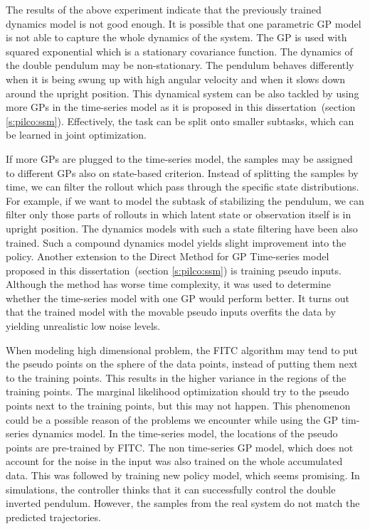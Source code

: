 \noindent The results of the above experiment indicate that the previously trained dynamics model is not good enough. It is possible that one parametric GP model is not able to capture the whole dynamics of the system. The GP is used with squared exponential which is a stationary covariance function. The dynamics of the double pendulum may be non-stationary. The pendulum behaves differently when it is being swung up with high angular velocity and when it slows down around the upright position. This dynamical system can be also tackled by using more GPs in the time-series model as it is proposed in this dissertation\ (section \ref{s:pilco:ssm}). Effectively, the task can be split onto smaller subtasks, which can be learned in joint optimization.

\noindent If more GPs are plugged to the time-series model, the samples may be assigned to different GPs also  on state-based criterion. Instead of splitting the samples by time, we can filter the rollout which pass through the specific state distributions. For example, if we want to model the subtask of stabilizing the pendulum, we can filter only those parts of rollouts in which latent state or observation itself is in upright position. The dynamics models with such a state filtering have been also trained. Such a compound dynamics model yields slight improvement into the policy. Another extension to the Direct Method for GP Time-series model proposed in this dissertation\ (section \ref{s:pilco:ssm}) is training pseudo inputs. Although the method has worse time complexity, it was used to determine whether the time-series model with one GP would perform better. It turns out that the trained model with the movable pseudo inputs overfits the data by yielding unrealistic low noise levels. 

\noindent When modeling high dimensional problem, the FITC algorithm may tend to put the pseudo points on the sphere of the data points, instead of putting them next to the training points. This results in the higher variance in the regions of the training points. The marginal likelihood optimization should try to the pseudo points next to the training points, but this may not happen. This phenomenon could be a possible reason of the problems we encounter while using the GP tim-series dynamics model. In the time-series model, the locations of the pseudo points are pre-trained by FITC. The non time-series GP model, which does not account for the noise in the input was also trained on the whole accumulated data. This was followed by training new policy model, which seems promising. In simulations, the controller thinks that it can successfully control the double inverted pendulum. However, the samples from the real system do not match the predicted trajectories.

